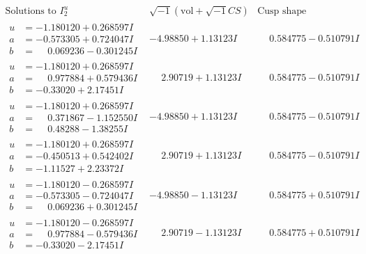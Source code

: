 \documentclass[1p]{elsarticle_modified}
\theoremstyle{definition}
\newcommand{\I}{\sqrt{-1}}
\begin{document}
$$\begin{array}{c|c|c}  
\text{Solutions to }I^u_{2}& \I (\text{vol} + \sqrt{-1}CS) & \text{Cusp shape}\\
 \hline 
\begin{aligned}
u &= -1.180120 + 0.268597 I \\
a &= -0.573305 + 0.724047 I \\
b &= \phantom{-}0.069236 - 0.301245 I\end{aligned}
 & -4.98850 + 1.13123 I & \phantom{-}0.584775 - 0.510791 I \\ \hline\begin{aligned}
u &= -1.180120 + 0.268597 I \\
a &= \phantom{-}0.977884 + 0.579436 I \\
b &= -0.33020 + 2.17451 I\end{aligned}
 & \phantom{-}2.90719 + 1.13123 I & \phantom{-}0.584775 - 0.510791 I \\ \hline\begin{aligned}
u &= -1.180120 + 0.268597 I \\
a &= \phantom{-}0.371867 - 1.152550 I \\
b &= \phantom{-}0.48288 - 1.38255 I\end{aligned}
 & -4.98850 + 1.13123 I & \phantom{-}0.584775 - 0.510791 I \\ \hline\begin{aligned}
u &= -1.180120 + 0.268597 I \\
a &= -0.450513 + 0.542402 I \\
b &= -1.11527 + 2.23372 I\end{aligned}
 & \phantom{-}2.90719 + 1.13123 I & \phantom{-}0.584775 - 0.510791 I \\ \hline\begin{aligned}
u &= -1.180120 - 0.268597 I \\
a &= -0.573305 - 0.724047 I \\
b &= \phantom{-}0.069236 + 0.301245 I\end{aligned}
 & -4.98850 - 1.13123 I & \phantom{-}0.584775 + 0.510791 I \\ \hline\begin{aligned}
u &= -1.180120 - 0.268597 I \\
a &= \phantom{-}0.977884 - 0.579436 I \\
b &= -0.33020 - 2.17451 I\end{aligned}
 & \phantom{-}2.90719 - 1.13123 I & \phantom{-}0.584775 + 0.510791 I \\ \hline\begin{aligned}

\end{aligned}
\end{array}$$
\end{document}
